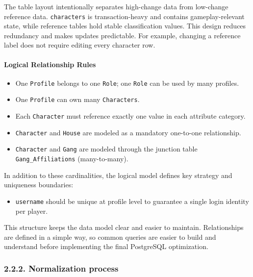 The table layout intentionally separates high-change data from
low-change reference data. \texttt{characters} is transaction-heavy and
contains gameplay-relevant state, while reference tables hold stable
classification values. This design reduces redundancy and makes updates
predictable. For example, changing a reference label does not require
editing every character row.

\hypertarget{logical-relationship-rules}{%
\paragraph{Logical Relationship
Rules}\label{logical-relationship-rules}}

\begin{itemize}
\tightlist
\item
  One \texttt{Profile} belongs to one \texttt{Role}; one \texttt{Role}
  can be used by many profiles.
\item
  One \texttt{Profile} can own many \texttt{Characters}.
\item
  Each \texttt{Character} must reference exactly one value in each
  attribute category.
\item
  \texttt{Character} and \texttt{House} are modeled as a mandatory
  one-to-one relationship.
\item
  \texttt{Character} and \texttt{Gang} are modeled through the junction
  table \texttt{Gang\_Affiliations} (many-to-many).
\end{itemize}

In addition to these cardinalities, the logical model defines key
strategy and uniqueness boundaries:

\begin{itemize}
\tightlist
\item
  \texttt{username} should be unique at profile level to guarantee a
  single login identity per player.
\end{itemize}

This structure keeps the data model clear and easier to maintain.
Relationships are defined in a simple way, so common queries are easier
to build and understand before implementing the final PostgreSQL
optimization.

\hypertarget{normalization-process}{%
\subsubsection{2.2.2. Normalization
process}\label{normalization-process}}

